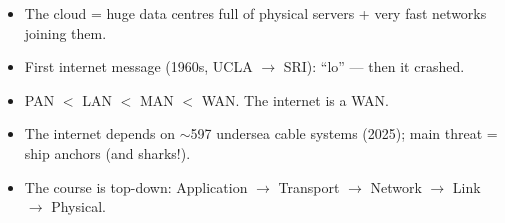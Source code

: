 \begin{recap}
\begin{itemize}
  \item The cloud = huge data centres full of physical servers + very fast networks joining them.
  \item First internet message (1960s, UCLA $\to$ SRI): ``lo'' --- then it crashed.
  \item PAN $<$ LAN $<$ MAN $<$ WAN. The internet is a WAN.
  \item The internet depends on $\sim$597 undersea cable systems (2025); main threat = ship anchors (and sharks!).
  \item The course is top-down: Application $\to$ Transport $\to$ Network $\to$ Link $\to$ Physical.
\end{itemize}
\end{recap}
